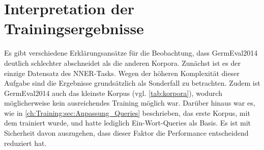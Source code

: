 \begin{table}[!htbp]
	\centering
	\caption{Evaluation des MRC Frameworks}
	\label{tab:evaluation}
\end{table}

\section{Interpretation der Trainingsergebnisse}
\label{ch:Evaluation:sec:Interpretation_der_Trainingsergebnisse}

Es gibt verschiedene Erklärungsansätze für die Beobachtung, dass GermEval2014 deutlich schlechter abschneidet als die anderen Korpora. Zunächst ist es der einzige Datensatz des NNER-Tasks. Wegen der höheren Komplexität dieser Aufgabe sind die Ergebnisse grundsätzlich als Sonderfall zu betrachten. Zudem ist GermEval2014 auch das kleinste Korpus (vgl. \autoref{tab:korpora}), wodurch möglicherweise kein ausreichendes Training möglich war. Darüber hinaus war es, wie in \autoref{ch:Training:sec:Anpassung_Queries} beschrieben, das erste Korpus, mit dem trainiert wurde, und hatte lediglich Ein-Wort-Queries als Basis. Es ist mit Sicherheit davon auszugehen, dass dieser Faktor die Performance entscheidend reduziert hat.

